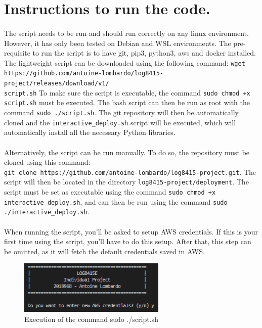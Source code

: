 \section{Instructions to run the code.} \label{T4}

\paragraph{}The script needs to be run and should run correctly on any linux environment. However, it has only been tested on Debian and WSL environments. The pre-requisite to run the script is to have git, pip3, python3, aws and docker installed. The lightweight script can be downloaded using the following command: \verb|wget https://github.com/antoine-lombardo/log8415-project/releases/download/v1/|\\\verb|script.sh| To make sure the script is executable, the command \verb|sudo chmod +x script.sh| must be executed. The bash script can then be run as root with the command \verb|sudo ./script.sh|. The git repository will then be automatically cloned and the \verb|interactive_deploy.sh| script will be executed, which will automatically install all the necessary Python libraries.

\paragraph{}Alternatively, the script can be run manually. To do so, the repository must be cloned using this command:\\\verb|git clone https://github.com/antoine-lombardo/log8415-project.git|. The script will then be located in the directory \verb|log8415-project/deployment|. The script must be set as executable using the command \verb|sudo chmod +x interactive_deploy.sh|, and can then be run using the command \verb|sudo ./interactive_deploy.sh|.

\paragraph{}When running the script, you'll be asked to setup AWS credentials. If this is your first time using the script, you'll have to do this setup. After that, this step can be omitted, as it will fetch the default credentials saved in AWS.\\

\begin{figure}[htbp]
  \centering
  \includegraphics[width=7cm]{Resources/script_1.png}
  \caption{Execution of the command sudo ./script.sh}
\end{figure}\\

